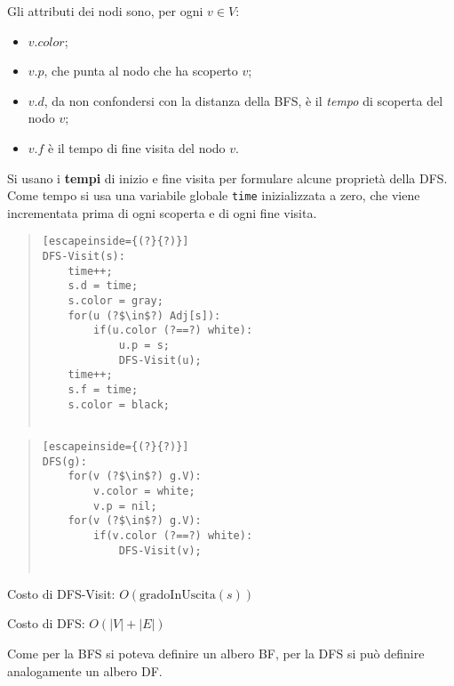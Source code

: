 \documentclass[a4paper,10pt]{article}
\theoremstyle{definition}
\begin{document}
Gli attributi dei nodi sono, per ogni $v \in V$:
\begin{itemize}
 \item $v.color$;
 \item $v.p$, che punta al nodo che ha scoperto $v$;
 \item $v.d$, da non confondersi con la distanza della BFS, è il \emph{tempo} di scoperta del nodo $v$;
 \item $v.f$ è il tempo di fine visita del nodo $v$.
\end{itemize}
Si usano i \textbf{tempi} di inizio e fine visita per formulare alcune proprietà della DFS. Come tempo si usa una variabile globale \texttt{time} inizializzata a zero, che viene incrementata prima di ogni scoperta e di ogni fine visita.
\begin{multicols}{2}
 
\begin{quote}
 \begin{lstlisting}[escapeinside={(?}{?)}]
DFS-Visit(s):
    time++;
    s.d = time;
    s.color = gray;
    for(u (?$\in$?) Adj[s]):
        if(u.color (?==?) white): 
            u.p = s;
            DFS-Visit(u);
    time++;
    s.f = time;
    s.color = black;
        
\end{lstlisting}
\end{quote}
\begin{quote}
 \begin{lstlisting}[escapeinside={(?}{?)}]
DFS(g):
    for(v (?$\in$?) g.V):
        v.color = white;
        v.p = nil;
    for(v (?$\in$?) g.V):
        if(v.color (?==?) white): 
            DFS-Visit(v);
        
\end{lstlisting}
\end{quote}

Costo di DFS-Visit: $O(\text{gradoInUscita}(s))$

Costo di DFS: $O(|V| + |E|)$


\end{multicols}
Come per la BFS si poteva definire un albero BF, per la DFS si può definire analogamente un albero DF.
\end{document}
